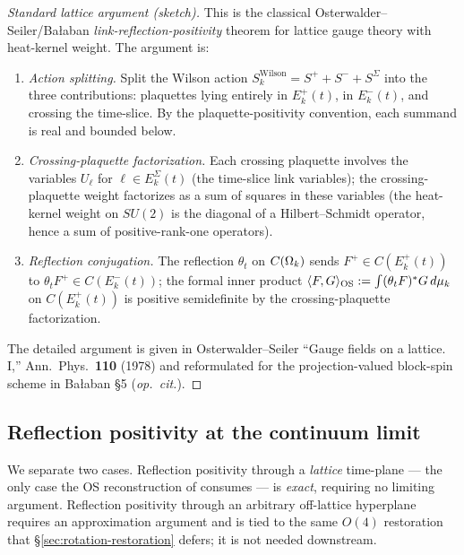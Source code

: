 \begin{proof}[Standard lattice argument (sketch)]
This is the classical Osterwalder--Seiler/Bałaban
\emph{link-reflection-positivity} theorem for lattice gauge theory
with heat-kernel weight.  The argument is:

\begin{enumerate}
  \item \emph{Action splitting.}  Split the Wilson action
    $S_k^{\mathrm{Wilson}} = S^+ + S^- + S^\Sigma$ into the three
    contributions: plaquettes lying entirely in $E_k^+(t)$, in
    $E_k^-(t)$, and crossing the time-slice.  By the
    plaquette-positivity convention, each summand is real and
    bounded below.
  \item \emph{Crossing-plaquette factorization.}  Each crossing
    plaquette involves the variables $U_\ell$ for $\ell \in
    E_k^{\Sigma}(t)$ (the time-slice link variables); the
    crossing-plaquette weight factorizes as a sum of squares in
    these variables (the heat-kernel weight on $SU(2)$ is the
    diagonal of a Hilbert--Schmidt operator, hence a sum of
    positive-rank-one operators).
  \item \emph{Reflection conjugation.}  The reflection $\theta_t$ on
    $C(\Omega_k)$ sends $F^+ \in C(E_k^+(t))$ to $\theta_t F^+ \in
    C(E_k^-(t))$; the formal inner product
    $\langle F, G \rangle_{\mathrm{OS}} := \int (\theta_t F)^* G \, d\mu_k$
    on $C(E_k^+(t))$ is positive semidefinite by the
    crossing-plaquette factorization.
\end{enumerate}

The detailed argument is given in Osterwalder--Seiler ``Gauge fields
on a lattice. I,'' Ann.\ Phys.\ \textbf{110} (1978) and reformulated
for the projection-valued block-spin scheme in
Bałaban \S5 (\emph{op.\ cit.}).
\end{proof}

\subsection{Reflection positivity at the continuum limit}

We separate two cases.  Reflection positivity through a
\emph{lattice} time-plane --- the only case the OS reconstruction of
 consumes --- is \emph{exact}, requiring no
limiting argument.  Reflection positivity through an arbitrary
off-lattice hyperplane requires an approximation argument and is tied
to the same $O(4)$ restoration that \S\ref{sec:rotation-restoration}
defers; it is not needed downstream.

